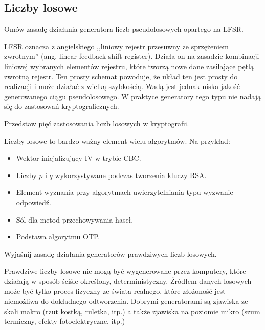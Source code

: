 \documentclass[answers,11pt]{exam}
\begin{document}
\subsection{Liczby losowe}
\begin{questions}

\question Omów zasadę działania generatora liczb pseudolosowych opartego na LFSR.
\begin{solution}
LFSR oznacza z angielskiego ,,liniowy rejestr przesuwny ze sprzężeniem zwrotnym'' (ang. linear feedback shift register). Działa on na zasadzie kombinacji liniowej wybranych elementów rejestru, które tworzą nowe dane zasilające pętlą zwrotną rejestr. Ten prosty schemat powoduje, że układ ten jest prosty do realizacji i może działać z wielką szybkością. Wadą jest jednak niska jakość generowanego ciągu pseudolosowego. W praktyce generatory tego typu nie nadają się do zastosowań kryptograficznych.
\end{solution}

\question Przedstaw pięć zastosowania liczb losowych w kryptografii.
\begin{solution}
Liczby losowe to bardzo ważny element wielu algorytmów. Na przykład:
\begin{itemize}
\item Wektor inicjalizujący IV w trybie CBC.
\item Liczby $p$ i $q$ wykorzystywane podczas tworzenia kluczy RSA.
\item Element wyznania przy algorytmach uwierzytelniania typu wyzwanie odpowiedź.
\item Sól dla metod przechowywania haseł.
\item Podstawa algorytmu OTP.
\end{itemize}
\end{solution}

\question Wyjaśnij zasadę działania generatorów prawdziwych liczb losowych.
\begin{solution}
Prawdziwe liczby losowe nie mogą być wygenerowane przez komputery, które działają w sposób ściśle określony, deterministyczny. Źródłem danych losowych może być tylko proces fizyczny ze świata realnego, które złożoność jest niemożliwa do dokładnego odtworzenia. Dobrymi generatorami są zjawiska ze skali makro (rzut kostką, ruletka, itp.) a także zjawiska na poziomie mikro (szum termiczny, efekty fotoelektryczne, itp.)
\end{solution}


\end{questions}
\end{document}
